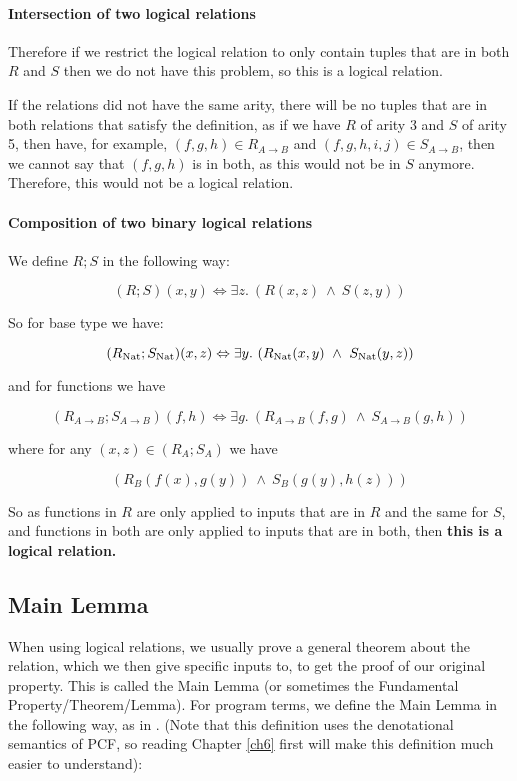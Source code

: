 \paragraph{Intersection of two logical relations}
Therefore if we restrict the logical relation to only contain tuples that are in both $R$ and $S$ then we do not have this problem, so this is a logical relation.

If the relations did not have the same arity, there will be no tuples that are in both relations that satisfy the definition, as if we have $R$ of arity 3 and $S$ of arity 5, then have, for example, $(f,g,h) \in R_{A \to B}$ and $(f,g,h,i,j) \in S_{A \to B}$, then we cannot say that $(f,g,h)$ is in both, as this would not be in $S$ anymore. Therefore, this would not be a logical relation.

\paragraph{Composition of two binary logical relations}
We define $R;S$ in the following way:

\[ (R;S)(x,y) \Leftrightarrow \exists z. \ (R(x,z) \ \wedge \ S(z,y))\]

So for base type we have:

\[ (R_{\operatorname{Nat}};S_{\operatorname{Nat}})(x,z) \Leftrightarrow \exists y. \ (R_{\operatorname{Nat}}(x,y) \ \wedge \ S_{\operatorname{Nat}}(y,z))\]

and for functions we have

\[ (R_{A \to B};S_{A \to B})(f,h) \Leftrightarrow \exists g. \ (R_{A \to B}(f,g) \ \wedge \ S_{A \to B}(g,h))\] 

where for any $(x,z) \in (R_A;S_A)$ we have

\[ (R_B(f(x),g(y)) \ \wedge \ S_B(g(y),h(z)))\] 

So as functions in $R$ are only applied to inputs that are in $R$ and the same for $S$, and functions in both are only applied to inputs that are in both, then \textbf{this is a logical relation.}  

\subsection{Main Lemma}
When using logical relations, we usually prove a general theorem about the relation, which we then give specific inputs to, to get the proof of our original property. This is called the Main Lemma (or sometimes the Fundamental Property/Theorem/Lemma). For program terms, we define the Main Lemma in the following way, as in \citep{Streicher06}. (Note that this definition uses the denotational semantics of PCF, so reading Chapter \ref{ch6} first will make this definition much easier to understand): 

